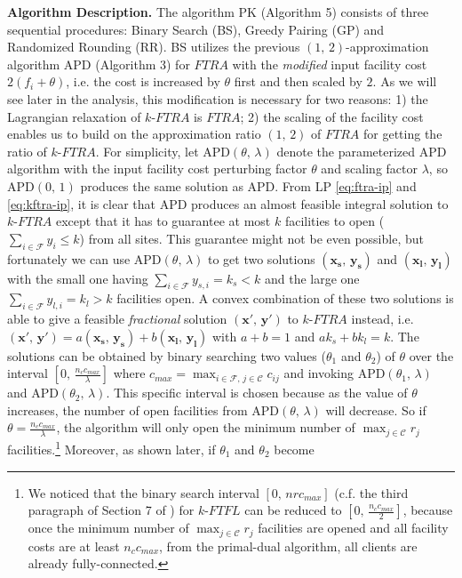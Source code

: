 \documentclass[10pt]{llncs}
\begin{document}
\textbf{Algorithm Description. }The algorithm PK (Algorithm 5) consists
of three sequential procedures: Binary Search (BS), Greedy Pairing
(GP) and Randomized Rounding (RR). BS utilizes the previous $\left(1,\,2\right)$-approximation
algorithm APD (Algorithm 3) for $FTRA$ with the \textit{modified}
input facility cost $2\left(f_{i}+\theta\right)$, i.e. the cost is
increased by $\theta$ first and then scaled by $2$. As we will see
later in the analysis, this modification is necessary for two reasons:
1) the Lagrangian relaxation of $k$-$FTRA$ is $FTRA$; 2) the scaling
of the facility cost enables us to build on the approximation ratio
$\left(1,\,2\right)$ of $FTRA$ for getting the ratio of $k$-$FTRA$.
For simplicity, let APD$\left(\theta,\,\lambda\right)$ denote the
parameterized APD algorithm with the input facility cost perturbing
factor $\theta$ and scaling factor $\lambda$, so APD$\left(0,\,1\right)$
produces the same solution as APD. From LP \eqref{eq:ftra-ip} and
\eqref{eq:kftra-ip}, it is clear that APD produces an almost feasible
integral solution to $k$-$FTRA$ except that it has to guarantee
at most $k$ facilities to open ($\sum_{i\in\mathcal{F}}y_{i}\leq k$)
from all sites. This guarantee might not be even possible, but fortunately
we can use APD$\left(\theta,\,\lambda\right)$ to get two solutions
$\left(\boldsymbol{x_{s}},\,\boldsymbol{y_{s}}\right)$ and $\left(\boldsymbol{x_{l}},\,\boldsymbol{y_{l}}\right)$
$ $with the small one having $\sum_{i\in\mathcal{F}}y_{s,i}=k_{s}<k$
and the large one $\sum_{i\in\mathcal{F}}y_{l,i}=k_{l}>k$ facilities
open. A convex combination of these two solutions is able to give
a feasible \textit{fractional} solution $\left(\boldsymbol{x'},\,\boldsymbol{y'}\right)$
to $k$-$FTRA$ instead, i.e. $\left(\boldsymbol{x'},\,\boldsymbol{y'}\right)=a\left(\boldsymbol{x_{s}},\,\boldsymbol{y_{s}}\right)+b\left(\boldsymbol{x_{l}},\,\boldsymbol{y_{l}}\right)$
with $a+b=1$ and $ak_{s}+bk_{l}=k$. The solutions can be obtained
by binary searching two values ($\theta_{1}$ and $\theta_{2}$) of
$\theta$ over the interval $\left[0,\,\frac{n_{c}c_{max}}{\lambda}\right]$
where $c_{max}=\max_{i\in\mathcal{F},\, j\in\mathcal{C}}c_{ij}$ and
invoking APD$\left(\theta_{1},\,\lambda\right)$ and APD$\left(\theta_{2},\,\lambda\right)$.
This specific interval is chosen because as the value of $\theta$
increases, the number of open facilities from APD$\left(\theta,\,\lambda\right)$
will decrease. So if $\theta=\frac{n_{c}c_{max}}{\lambda}$, the algorithm
will only open the minimum number of $\max_{j\in\mathcal{C}}r_{j}$
facilities.\footnote{We noticed that the binary search interval $\left[0,\, nrc_{max}\right]$
(c.f. the third paragraph of Section 7 of \cite{Swamy08FTFL2.076})
for $k$-$FTFL$ can be reduced to $\left[0,\,\frac{n_{c}c_{max}}{2}\right]$,
because once the minimum number of $\max_{j\in\mathcal{C}}r_{j}$
facilities are opened and all facility costs are at least $n_{c}c_{max}$,
from the primal-dual algorithm, all clients are already fully-connected.} Moreover, as shown later, if $\theta_{1}$ and $\theta_{2}$ become
\end{document}
